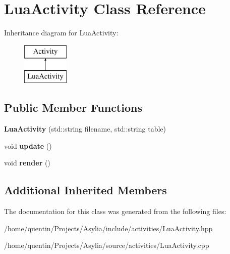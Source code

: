 \hypertarget{classLuaActivity}{\section{Lua\-Activity Class Reference}
\label{classLuaActivity}
}
Inheritance diagram for Lua\-Activity\-:\begin{figure}[H]
\begin{center}
\leavevmode
\includegraphics[height=2.000000cm]{classLuaActivity}
\end{center}
\end{figure}
\subsection*{Public Member Functions}
\begin{DoxyCompactItemize}
\item 
\hypertarget{classLuaActivity_a8eb438c54bfa69d3358539eab4838182}{{\bfseries Lua\-Activity} (std\-::string filename, std\-::string table)}\label{classLuaActivity_a8eb438c54bfa69d3358539eab4838182}

\item 
\hypertarget{classLuaActivity_a389d57bbec086396da7bebace6230e41}{void {\bfseries update} ()}\label{classLuaActivity_a389d57bbec086396da7bebace6230e41}

\item 
\hypertarget{classLuaActivity_ab2faeeaf6822a3b5ed02ef50e9568b53}{void {\bfseries render} ()}\label{classLuaActivity_ab2faeeaf6822a3b5ed02ef50e9568b53}

\end{DoxyCompactItemize}
\subsection*{Additional Inherited Members}


The documentation for this class was generated from the following files\-:\begin{DoxyCompactItemize}
\item 
/home/quentin/\-Projects/\-Asylia/include/activities/Lua\-Activity.\-hpp\item 
/home/quentin/\-Projects/\-Asylia/source/activities/Lua\-Activity.\-cpp\end{DoxyCompactItemize}
